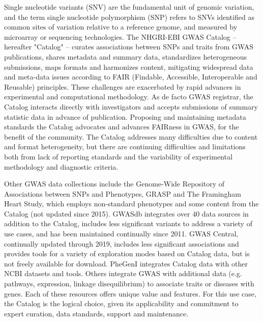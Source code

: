 Single nucleotide variants (SNV) are the fundamental unit of genomic variation, and the term single nucleotide polymorphism (SNP) refers to SNVs identified as common sites of variation relative to a reference genome, and measured by microarray or sequencing technologies. The NHGRI-EBI GWAS Catalog\cite{Buniello2019-iw} -- hereafter "Catalog" -- curates associations between SNPs and traits from GWAS publications, shares metadata and summary data, standardizes heterogeneous submissions, maps formats and harmonizes content, mitigating widespread data and meta-data issues according to FAIR (Findable, Accessible, Interoperable and Reusable) principles\cite{Wilkinson2016-xu}. These challenges are exacerbated by rapid advances in experimental and computational methodology. As de facto GWAS registrar, the Catalog interacts directly with investigators and accepts submissions of summary statistic data in advance of publication. Proposing and maintaining metadata standards the Catalog advocates and advances FAIRness in GWAS, for the benefit of the community. The Catalog addresses many difficulties due to content and format heterogeneity, but there are continuing difficulties and limitations both from lack of reporting standards and the variability of experimental methodology and diagnostic criteria.

Other GWAS data collections include the Genome-Wide Repository of Associations between SNPs and Phenotypes, GRASP\cite{Eicher2015-ph} and The Framingham Heart Study, which employs non-standard phenotypes and some content from the Catalog (not updated since 2015). GWASdb\cite{Li2016-fo} integrates over 40 data sources in addition to the Catalog, includes less significant variants to address a variety of use cases, and has been maintained continually since 2011. GWAS Central, continually updated through 2019, includes less significant associations and provides tools for a variety of exploration modes based on Catalog data, but is not freely available for download. PheGenI\cite{Ramos2014-zq} integrates Catalog data with other NCBI datasets and tools. Others integrate GWAS with additional data (e.g. pathways, expression, linkage disequilibrium) to associate traits or diseases with genes\cite{Palleja2012-mb,Greene2015-ix,Shen2017-tt,Li2018-vj,Wainberg2019-ry}. Each of these resources offers unique value and features. For this use case, the Catalog is the logical choice, given its applicability and commitment to expert curation, data standards, support and maintenance.

